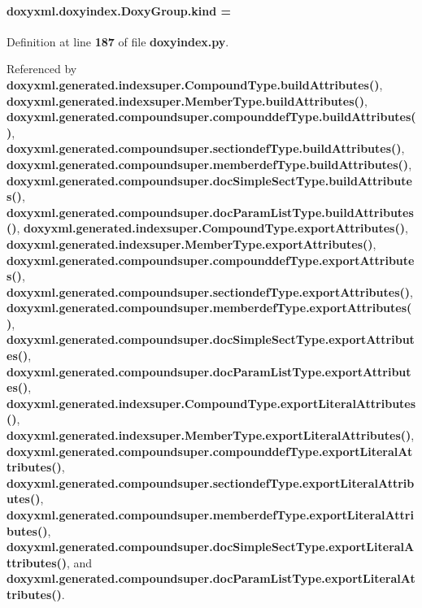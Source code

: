 \paragraph[{kind}]{ doxyxml.\+doxyindex.\+Doxy\+Group.\+kind = \textquotesingle{}\hspace{0.3cm}{\ttfamily [static]}}\label{classdoxyxml_1_1doxyindex_1_1DoxyGroup_a34e170a42812d7ee033735ee5ce14acf}


Definition at line {\bf 187} of file {\bf doxyindex.\+py}.



Referenced by {\bf doxyxml.\+generated.\+indexsuper.\+Compound\+Type.\+build\+Attributes()}, {\bf doxyxml.\+generated.\+indexsuper.\+Member\+Type.\+build\+Attributes()}, {\bf doxyxml.\+generated.\+compoundsuper.\+compounddef\+Type.\+build\+Attributes()}, {\bf doxyxml.\+generated.\+compoundsuper.\+sectiondef\+Type.\+build\+Attributes()}, {\bf doxyxml.\+generated.\+compoundsuper.\+memberdef\+Type.\+build\+Attributes()}, {\bf doxyxml.\+generated.\+compoundsuper.\+doc\+Simple\+Sect\+Type.\+build\+Attributes()}, {\bf doxyxml.\+generated.\+compoundsuper.\+doc\+Param\+List\+Type.\+build\+Attributes()}, {\bf doxyxml.\+generated.\+indexsuper.\+Compound\+Type.\+export\+Attributes()}, {\bf doxyxml.\+generated.\+indexsuper.\+Member\+Type.\+export\+Attributes()}, {\bf doxyxml.\+generated.\+compoundsuper.\+compounddef\+Type.\+export\+Attributes()}, {\bf doxyxml.\+generated.\+compoundsuper.\+sectiondef\+Type.\+export\+Attributes()}, {\bf doxyxml.\+generated.\+compoundsuper.\+memberdef\+Type.\+export\+Attributes()}, {\bf doxyxml.\+generated.\+compoundsuper.\+doc\+Simple\+Sect\+Type.\+export\+Attributes()}, {\bf doxyxml.\+generated.\+compoundsuper.\+doc\+Param\+List\+Type.\+export\+Attributes()}, {\bf doxyxml.\+generated.\+indexsuper.\+Compound\+Type.\+export\+Literal\+Attributes()}, {\bf doxyxml.\+generated.\+indexsuper.\+Member\+Type.\+export\+Literal\+Attributes()}, {\bf doxyxml.\+generated.\+compoundsuper.\+compounddef\+Type.\+export\+Literal\+Attributes()}, {\bf doxyxml.\+generated.\+compoundsuper.\+sectiondef\+Type.\+export\+Literal\+Attributes()}, {\bf doxyxml.\+generated.\+compoundsuper.\+memberdef\+Type.\+export\+Literal\+Attributes()}, {\bf doxyxml.\+generated.\+compoundsuper.\+doc\+Simple\+Sect\+Type.\+export\+Literal\+Attributes()}, and {\bf doxyxml.\+generated.\+compoundsuper.\+doc\+Param\+List\+Type.\+export\+Literal\+Attributes()}.



